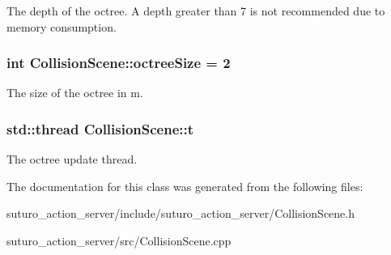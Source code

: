 The depth of the octree. A depth greater than 7 is not recommended due to memory consumption. \hypertarget{classCollisionScene_aa50f77359129b8a44335d76ee3420cc7}{
\subsubsection[{octree\-Size}]{\setlength{\rightskip}{0pt plus 5cm}int Collision\-Scene\-::octree\-Size = 2\hspace{0.3cm}{\ttfamily [private]}}}\label{classCollisionScene_aa50f77359129b8a44335d76ee3420cc7}
The size of the octree in m. \hypertarget{classCollisionScene_af8a098eaddd613c3312f63c4b6a99a1a}{
\subsubsection[{t}]{\setlength{\rightskip}{0pt plus 5cm}std\-::thread Collision\-Scene\-::t\hspace{0.3cm}{\ttfamily [private]}}}\label{classCollisionScene_af8a098eaddd613c3312f63c4b6a99a1a}
The octree update thread. 

The documentation for this class was generated from the following files\-:\begin{DoxyCompactItemize}
\item 
suturo\-\_\-action\-\_\-server/include/suturo\-\_\-action\-\_\-server/Collision\-Scene.\-h\item 
suturo\-\_\-action\-\_\-server/src/Collision\-Scene.\-cpp\end{DoxyCompactItemize}
